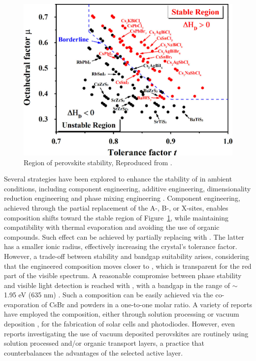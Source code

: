 \begin{figure}[htbp]
  \centering
  \medskip
  \includegraphics[width=.67\textwidth]{chapters/introduction/image/perovskite_stability.jpeg}
  \caption[Short caption for Table of Figures]{Region of perovskite stability, Reproduced from \cite{Sun2017ThermodynamicPerovskites}.}
  \label{fig:ch2:perovskite_stable_region}
\end{figure}

Several strategies have been explored to enhance the stability of  in ambient conditions, including component engineering, additive engineering, dimensionality reduction engineering and phase mixing engineering \cite{Lei2024StabilityPerovskites, Jin2024PhaseDevices}. Component engineering, achieved through the partial replacement of the A-, B-, or X-sites, enables composition shifts toward the stable region of Figure~\ref{fig:ch2:perovskite_stable_region}, while maintaining compatibility with thermal evaporation and avoiding the use of organic compounds. Such effect can be achieved by partially replacing  with . The latter has a smaller ionic radius, effectively increasing the crystal's tolerance factor. However, a trade-off between stability and bandgap suitability arises, considering that the engineered composition moves closer to , which is transparent for the red part of the visible spectrum. A reasonable compromise between phase stability and visible light detection is reached with , with a bandgap in the range of $\sim$ 1.95 eV (635 nm) \cite{Nasstrom2020DependenceExperimentation}. Such a composition can be easily achieved via the co-evaporation of CsBr and  powders in a one-to-one molar ratio. A variety of reports have employed the  composition, either through solution processing \cite{Roy2025All-inorganicLayers, Zhang2019HighCells,Dong2021High-TemperatureCells,Zhang2021ModificationEfficiency,Wang2020HighlyBase,Zheng2021ImprovedCells,Mariotti2018StabilityDevices,Mali2019Hot-Air-AssistedCells,Zheng2021ImprovedCells}  or vacuum deposition \cite{Lin2019EfficientDeposition,Chen2017All-Vacuum-Deposited11,Igual-Munoz2020Room-TemperaturePrecursors, Ma2017TheCells, Lai2022All-Vacuum-DepositedCm-3}, for the fabrication of solar cells and photodiodes. However, even reports investigating the use of vacuum deposited perovskites are routinely using solution processed and/or organic transport layers, a practice that counterbalances the advantages of the selected active layer. 


